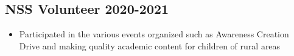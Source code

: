 \documentclass[10pt]{article}
\newenvironment{zitemize}{
\begin{itemize}\itemsep2pt \parskip0pt \parsep1pt}
{\end{itemize}\vspace{-0.5cm}}
\newcommand{\hskills}[1]{
\textbf{\bfseries #1} }
\begin{document}
\subsection*{NSS Volunteer \hfill 2020-2021} 
    \begin{zitemize}
            \item Participated in the various events organized such as Awareness Creation Drive and making quality academic content for children of rural areas
    \end{zitemize}







\end{document}
